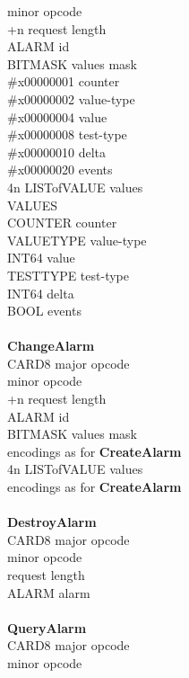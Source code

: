 \begin{tabbing}
				\> minor opcode \\
		+n		\> request length \\
		\> ALARM	\> id \\
		\> BITMASK	\> values mask\\
\tabstopsB
	\>	\> \#x00000001	\> counter \\
	\>	\> \#x00000002	\> value-type \\
	\>	\> \#x00000004	\> value \\
	\>	\> \#x00000008	\> test-type \\
	\>	\> \#x00000010	\> delta \\
	\>	\>  \#x00000020	\> events \\
\tabstopsC
	\> 4n	\> LISTofVALUE	\> values\\
\tabstopsB
VALUES\\
		\> COUNTER	\> counter\\
		\> VALUETYPE	\> value-type \\
		\> INT64	\> value \\
		\> TESTTYPE	\> test-type \\
		\> INT64	\> delta \\
		\> BOOL		\> events\\
\tabstopsC
\\
{\bf ChangeAlarm}\\
		\> CARD8	\> major opcode \\
				\> minor opcode \\
		+n		\> request length \\
		\> ALARM	\> id \\
		\> BITMASK	\> values mask \\
	\> 	\> encodings as for {\bf CreateAlarm}\\
	\> 4n	\> LISTofVALUE	\> values\\
	\>	\> encodings as for {\bf CreateAlarm}\\
\\
{\bf DestroyAlarm}\\
		\> CARD8	\> major opcode \\
	\> 1			\> minor opcode \\
	\> 2			\> request length \\
		\> ALARM	\> alarm\\
\\
{\bf QueryAlarm}\\
		\> CARD8	\> major opcode \\
	\> 1			\> minor opcode \\

\end{tabbing}
